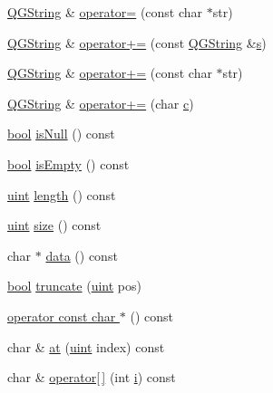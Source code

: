 \begin{DoxyCompactItemize}
\item 
\hyperlink{class_q_g_string}{Q\+G\+String} \& \hyperlink{class_q_g_string_ade199d24293874d40038ba9ff3a5394b}{operator=} (const char $\ast$str)
\item 
\hyperlink{class_q_g_string}{Q\+G\+String} \& \hyperlink{class_q_g_string_a34f9c345f72d6d97db605eee76d038da}{operator+=} (const \hyperlink{class_q_g_string}{Q\+G\+String} \&\hyperlink{060__command__switch_8tcl_a011c73f2dbb87635a3b4206c72355f6e}{s})
\item 
\hyperlink{class_q_g_string}{Q\+G\+String} \& \hyperlink{class_q_g_string_a7268b8f2811a4cc43a3a1e7a585af1c8}{operator+=} (const char $\ast$str)
\item 
\hyperlink{class_q_g_string}{Q\+G\+String} \& \hyperlink{class_q_g_string_a8b96e7d6a99e481543294c2a0dd373d3}{operator+=} (char \hyperlink{060__command__switch_8tcl_ab14f56bc3bd7680490ece4ad7815465f}{c})
\item 
\hyperlink{qglobal_8h_a1062901a7428fdd9c7f180f5e01ea056}{bool} \hyperlink{class_q_g_string_ad4a4e7d1f81051282059924b2284c09e}{is\+Null} () const 
\item 
\hyperlink{qglobal_8h_a1062901a7428fdd9c7f180f5e01ea056}{bool} \hyperlink{class_q_g_string_aa420b8f1a77547df15e6185520da2126}{is\+Empty} () const 
\item 
\hyperlink{qglobal_8h_a4d3943ddea65db7163a58e6c7e8df95a}{uint} \hyperlink{class_q_g_string_a09dec7546098023761fb545f55f1b3e0}{length} () const 
\item 
\hyperlink{qglobal_8h_a4d3943ddea65db7163a58e6c7e8df95a}{uint} \hyperlink{class_q_g_string_abaeb3ec3797729e457aea15edc240ade}{size} () const 
\item 
char $\ast$ \hyperlink{class_q_g_string_ae9e4369693ea2cc6308e35a587752996}{data} () const 
\item 
\hyperlink{qglobal_8h_a1062901a7428fdd9c7f180f5e01ea056}{bool} \hyperlink{class_q_g_string_a9f35cff72d32aafbb2e08bd0ac59765d}{truncate} (\hyperlink{qglobal_8h_a4d3943ddea65db7163a58e6c7e8df95a}{uint} pos)
\item 
\hyperlink{class_q_g_string_a184afc83f986a8781ce48cd8041cf6cd}{operator const char $\ast$} () const 
\item 
char \& \hyperlink{class_q_g_string_a10a9f8928c799794392e723824fa55c4}{at} (\hyperlink{qglobal_8h_a4d3943ddea65db7163a58e6c7e8df95a}{uint} index) const 
\item 
char \& \hyperlink{class_q_g_string_ab6deba24ddec3e292e293fd378414489}{operator\mbox{[}$\,$\mbox{]}} (int \hyperlink{060__command__switch_8tcl_a8c90afd4641b25be86bd09983c3cbee0}{i}) const 
\end{DoxyCompactItemize}


